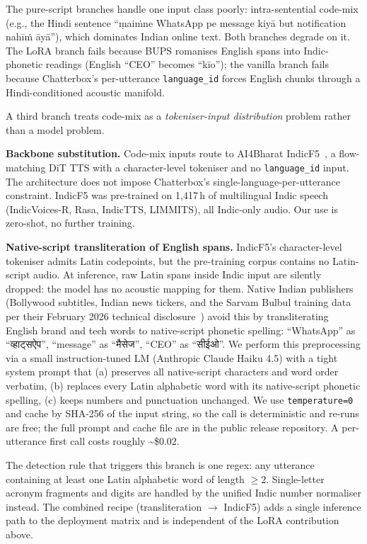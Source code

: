 \documentclass[conference,a4paper]{IEEEtran}
\newcommand{\texthi}[1]{{\devanagarifont #1}}
\begin{document}
The pure-script branches handle one input class poorly: intra-sentential code-mix (e.g., the Hindi sentence ``\textsf{\d{m}aiṁne WhatsApp pe message kiyā but notification nahīṁ āyā}''), which dominates Indian online text. Both branches degrade on it. The LoRA branch fails because BUPS romanises English spans into Indic-phonetic readings (English ``CEO'' becomes ``\textsf{kīo}''); the vanilla branch fails because Chatterbox's per-utterance \texttt{language\_id} forces English chunks through a Hindi-conditioned acoustic manifold.

A third branch treats code-mix as a \emph{tokeniser-input distribution} problem rather than a model problem.

\textbf{Backbone substitution.} Code-mix inputs route to AI4Bharat IndicF5~\cite{indicf52024}, a flow-matching DiT TTS with a character-level tokeniser and no \texttt{language\_id} input. The architecture does not impose Chatterbox's single-language-per-utterance constraint. IndicF5 was pre-trained on 1{,}417\,h of multilingual Indic speech (IndicVoices-R, Rasa, IndicTTS, LIMMITS), all Indic-only audio. Our use is zero-shot, no further training.

\textbf{Native-script transliteration of English spans.} IndicF5's character-level tokeniser admits Latin codepoints, but the pre-training corpus contains no Latin-script audio. At inference, raw Latin spans inside Indic input are silently dropped: the model has no acoustic mapping for them. Native Indian publishers (Bollywood subtitles, Indian news tickers, and the Sarvam Bulbul training data per their February 2026 technical disclosure~\cite{sarvam_bulbul2026}) avoid this by transliterating English brand and tech words to native-script phonetic spelling: ``WhatsApp'' as ``\texthi{व्हाट्सऐप}'', ``message'' as ``\texthi{मैसेज}'', ``CEO'' as ``\texthi{सीईओ}''. We perform this preprocessing via a small instruction-tuned LM (Anthropic Claude Haiku 4.5) with a tight system prompt that (a) preserves all native-script characters and word order verbatim, (b) replaces every Latin alphabetic word with its native-script phonetic spelling, (c) keeps numbers and punctuation unchanged. We use \texttt{temperature=0} and cache by SHA-256 of the input string, so the call is deterministic and re-runs are free; the full prompt and cache file are in the public release repository. A per-utterance first call costs roughly \textasciitilde\$0.02.

The detection rule that triggers this branch is one regex: any utterance containing at least one Latin alphabetic word of length $\geq 2$. Single-letter acronym fragments and digits are handled by the unified Indic number normaliser instead. The combined recipe (transliteration $\to$ IndicF5) adds a single inference path to the deployment matrix and is independent of the LoRA contribution above.
\end{document}
